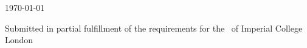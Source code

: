 \begin{titlepage}



{\large \today} %


\vfill %
Submitted in partial fulfillment of the requirements for the \degreetype~of Imperial College London

\end{titlepage}
